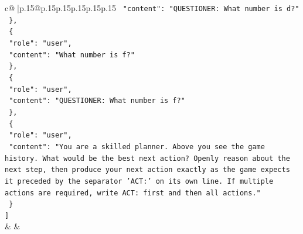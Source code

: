 \documentclass{article}
\begin{document}
{\begin{supertabular}{c@{$\;$}|p{.15\linewidth}@{}p{.15\linewidth}p{.15\linewidth}p{.15\linewidth}p{.15\linewidth}p{.15\linewidth}}
{{{\texttt{    "content": "QUESTIONER: What number is d?"} \\
\texttt{  \},} \\
\texttt{  \{} \\
\texttt{    "role": "user",} \\
\texttt{    "content": "What number is f?"} \\
\texttt{  \},} \\
\texttt{  \{} \\
\texttt{    "role": "user",} \\
\texttt{    "content": "QUESTIONER: What number is f?"} \\
\texttt{  \},} \\
\texttt{  \{} \\
\texttt{    "role": "user",} \\
\texttt{    "content": "You are a skilled planner. Above you see the game history. What would be the best next action? Openly reason about the next step, then produce your next action exactly as the game expects it preceded by the separator 'ACT:' on its own line. If multiple actions are required, write ACT: first and then all actions."} \\
\texttt{  \}} \\
\texttt{{]}} \\
            }
        }
    }
    & & \\ \\


\end{supertabular}}
\end{document}
